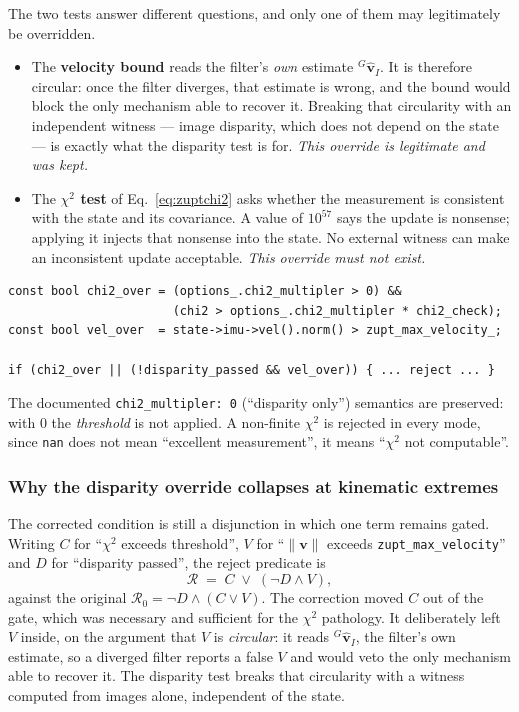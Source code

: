 The two tests answer different questions, and only one of them may legitimately
be overridden.

\begin{itemize}
  \item The \textbf{velocity bound} reads the filter's \emph{own} estimate
        ${}^{G}\hat{\mathbf{v}}_{I}$. It is therefore circular: once the filter
        diverges, that estimate is wrong, and the bound would block the only
        mechanism able to recover it. Breaking that circularity with an
        independent witness --- image disparity, which does not depend on the
        state --- is exactly what the disparity test is for. \emph{This
        override is legitimate and was kept.}
  \item The \textbf{$\chi^{2}$ test} of Eq.~\eqref{eq:zuptchi2} asks whether the
        measurement is consistent with the state and its covariance. A value of
        $10^{57}$ says the update is nonsense; applying it injects that
        nonsense into the state. No external witness can make an inconsistent
        update acceptable. \emph{This override must not exist.}
\end{itemize}

\begin{verbatim}
const bool chi2_over = (options_.chi2_multipler > 0) &&
                       (chi2 > options_.chi2_multipler * chi2_check);
const bool vel_over  = state->imu->vel().norm() > zupt_max_velocity_;

if (chi2_over || (!disparity_passed && vel_over)) { ... reject ... }
\end{verbatim}

The documented \texttt{chi2\_multipler:~0} (``disparity only'') semantics are
preserved: with $0$ the \emph{threshold} is not applied. A non-finite
$\chi^{2}$ is rejected in every mode, since \texttt{nan} does not mean
``excellent measurement'', it means ``$\chi^{2}$ not computable''.

\subsubsection{Why the disparity override collapses at kinematic extremes}
\label{sssec:plafond}

The corrected condition is still a disjunction in which one term remains
gated. Writing $C$ for ``$\chi^{2}$ exceeds threshold'', $V$ for
``$\lVert\mathbf{v}\rVert$ exceeds \texttt{zupt\_max\_velocity}'' and $D$
for ``disparity passed'', the reject predicate is
%
\begin{equation}
  \mathcal{R} \;=\; C \;\vee\; (\lnot D \wedge V),
  \label{eq:reject}
\end{equation}
%
against the original $\mathcal{R}_{0} = \lnot D \wedge (C \vee V)$. The
correction moved $C$ out of the gate, which was necessary and sufficient for the
$\chi^{2}$ pathology. It deliberately left $V$ inside, on the argument that
$V$ is \emph{circular}: it reads
${}^{G}\hat{\mathbf{v}}_{I}$, the filter's own estimate, so a diverged filter
reports a false $V$ and would veto the only mechanism able to recover it. The
disparity test breaks that circularity with a witness computed from images
alone, independent of the state.

